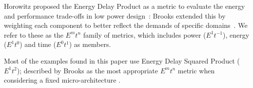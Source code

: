 Horowitz proposed the Energy Delay Product as a metric to evaluate the energy and performance trade-offs in low power design~\cite{horowitz:1994aa}:
Brooks extended this by weighting each component to better reflect the demands of specific domains~\cite{brooks:2000ab}.
We refer to these as the $E^mt^n$ family of metrics, which includes power ($E^1t^{-1}$), energy ($E^1t^0$) and time ($E^0t^1$) as members.

Most of the examples found in this paper use Energy Delay Squared Product ($E^1t^2$); described by Brooks as the most appropriate $E^mt^n$ metric when considering a fixed micro-architecture \cite{brooks:2000aa}.
